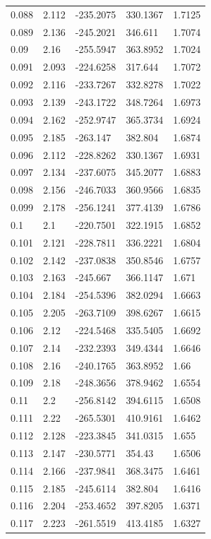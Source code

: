 \begin{tabular}{lllll}
0.088 & 2.112 & -235.2075 & 330.1367 & 1.7125 \\
0.089 & 2.136 & -245.2021 & 346.611 & 1.7074 \\
0.09 & 2.16 & -255.5947 & 363.8952 & 1.7024 \\
0.091 & 2.093 & -224.6258 & 317.644 & 1.7072 \\
0.092 & 2.116 & -233.7267 & 332.8278 & 1.7022 \\
0.093 & 2.139 & -243.1722 & 348.7264 & 1.6973 \\
0.094 & 2.162 & -252.9747 & 365.3734 & 1.6924 \\
0.095 & 2.185 & -263.147 & 382.804 & 1.6874 \\
0.096 & 2.112 & -228.8262 & 330.1367 & 1.6931 \\
0.097 & 2.134 & -237.6075 & 345.2077 & 1.6883 \\
0.098 & 2.156 & -246.7033 & 360.9566 & 1.6835 \\
0.099 & 2.178 & -256.1241 & 377.4139 & 1.6786 \\
0.1 & 2.1 & -220.7501 & 322.1915 & 1.6852 \\
0.101 & 2.121 & -228.7811 & 336.2221 & 1.6804 \\
0.102 & 2.142 & -237.0838 & 350.8546 & 1.6757 \\
0.103 & 2.163 & -245.667 & 366.1147 & 1.671 \\
0.104 & 2.184 & -254.5396 & 382.0294 & 1.6663 \\
0.105 & 2.205 & -263.7109 & 398.6267 & 1.6615 \\
0.106 & 2.12 & -224.5468 & 335.5405 & 1.6692 \\
0.107 & 2.14 & -232.2393 & 349.4344 & 1.6646 \\
0.108 & 2.16 & -240.1765 & 363.8952 & 1.66 \\
0.109 & 2.18 & -248.3656 & 378.9462 & 1.6554 \\
0.11 & 2.2 & -256.8142 & 394.6115 & 1.6508 \\
0.111 & 2.22 & -265.5301 & 410.9161 & 1.6462 \\
0.112 & 2.128 & -223.3845 & 341.0315 & 1.655 \\
0.113 & 2.147 & -230.5771 & 354.43 & 1.6506 \\
0.114 & 2.166 & -237.9841 & 368.3475 & 1.6461 \\
0.115 & 2.185 & -245.6114 & 382.804 & 1.6416 \\
0.116 & 2.204 & -253.4652 & 397.8205 & 1.6371 \\
0.117 & 2.223 & -261.5519 & 413.4185 & 1.6327 \\

\end{tabular}
